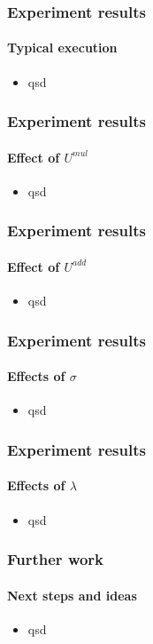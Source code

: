 \documentclass[fleqn]{beamer}
\begin{document}
\begin{frame}
	\frametitle{Experiment results}
	\framesubtitle{Typical execution}
	\begin{itemize}
	\item qsd
	\end{itemize}
\end{frame}



\begin{frame}
	\frametitle{Experiment results}
	\framesubtitle{Effect of $U^{mul}$}
	\begin{itemize}
	\item qsd
	\end{itemize}
\end{frame}



\begin{frame}
	\frametitle{Experiment results}
	\framesubtitle{Effect of $U^{add}$}
	\begin{itemize}
	\item qsd
	\end{itemize}
\end{frame}



\begin{frame}
	\frametitle{Experiment results}
	\framesubtitle{Effects of $\sigma$}
	\begin{itemize}
	\item qsd
	\end{itemize}
\end{frame}


\begin{frame}
	\frametitle{Experiment results}
	\framesubtitle{Effects of $\lambda$}
	\begin{itemize}
	\item qsd
	\end{itemize}
\end{frame}


\begin{frame}
	\frametitle{Further work}
	\framesubtitle{Next steps and ideas}
	\begin{itemize}
	\item qsd
	\end{itemize}
\end{frame}
\end{document}
